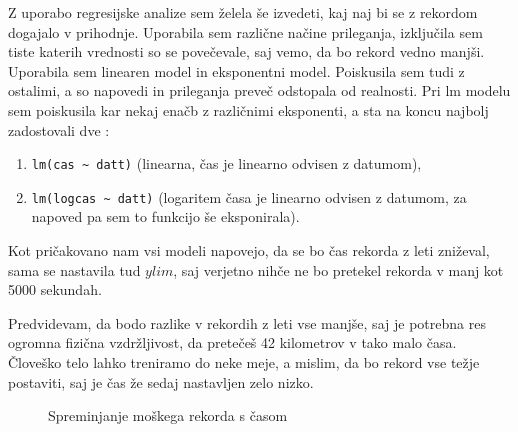 \documentclass[11pt,a4paper]{article}
\begin{document}
Z uporabo regresijske analize sem želela še izvedeti, kaj naj bi se z rekordom dogajalo v prihodnje. Uporabila sem različne načine prileganja, izključila sem tiste katerih vrednosti so se povečevale, saj vemo, da bo rekord vedno manjši.
Uporabila sem  linearen model in eksponentni model. Poiskusila sem tudi z ostalimi, a so napovedi in prileganja preveč odstopala od realnosti.
Pri lm modelu sem poiskusila kar nekaj enačb z različnimi eksponenti, a sta na koncu najbolj zadostovali dve :
\begin{enumerate}
\item{\verb|lm(cas ~ datt)| (linearna, čas je linearno odvisen z datumom),}
\item{\verb|lm(logcas ~ datt)| (logaritem časa je linearno odvisen z datumom, za napoved pa sem to funkcijo še eksponirala).}

\end{enumerate}

Kot pričakovano nam vsi modeli napovejo, da se bo čas rekorda z leti zniževal, sama se nastavila tud $ylim$, saj verjetno nihče ne bo pretekel rekorda v manj kot 5000 sekundah.

Predvidevam, da bodo razlike v rekordih z leti vse manjše, saj je potrebna res ogromna fizična vzdržljivost, da  pretečeš 42 kilometrov v tako malo časa. Človeško telo lahko treniramo do neke meje, a mislim, da bo rekord vse težje postaviti, saj je čas že sedaj nastavljen zelo nizko.

\begin{figure}[H]
  \caption{Spreminjanje moškega rekorda s časom}
  \label{fig:Slika 4}
\end{figure}
\end{document}
